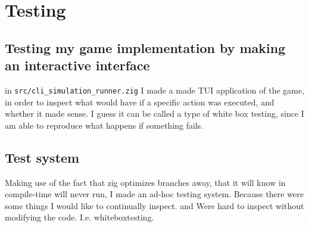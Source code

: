 \section{Testing}

\subsection{Testing my game implementation by making an interactive interface}

in {\tt src/cli\_simulation\_runner.zig} I made a made TUI application of the game, in order to inspect what would have if a specific action was executed, and whether it made sense. I guess it can be called a type of white box testing, since I am able to reproduce what happens if something fails.


\subsection{Test system}
Making use of the fact that zig optimizes branches away, that it will know in compile-time will never run, I made an ad-hoc testing system. Because there were some things I would like to continually inspect. and Were hard to inspect without modifying the code. I.e. whiteboxtesting.
